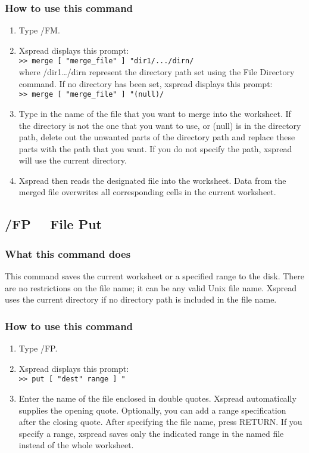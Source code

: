 \subsubsection*{How to use this command}
\begin{enumerate}
\item{Type /FM.}
\item{Xspread displays this prompt:\\
        \verb|>> merge [ "merge_file" ] "dir1/.../dirn/|\\
        where /dir1\ldots /dirn represent the directory path set using the
        File Directory command.  If no directory has been set, xspread
        displays this prompt:\\
        \verb|>> merge [ "merge_file" ] "(null)/| }
\item{Type in the name of the file that you want to merge into the
        worksheet.  If the directory is not the one that you want to use,
        or (null) is in the directory path, delete out the unwanted parts
        of the directory path and replace these parts with the path that
        you want.  If you do not specify the path, xspread will use the
        current directory. }
\item{Xspread then reads the designated file into the worksheet.  Data
        from the merged file overwrites all corresponding cells in the
        current worksheet.}
\end{enumerate}
        
\subsection*{/FP \ \     File Put}

\subsubsection*{What this command does}
This command saves the current worksheet or a specified range to the 
disk.  There are no restrictions on the file name; it can be any valid 
Unix file name.  Xspread uses the current directory if no directory 
path is included in the file name.

\subsubsection*{How to use this command}
\begin{enumerate}
\item{Type /FP.}
\item{Xspread displays this prompt:\\
        {\tt >> put [ "dest" range ] "} }
\item{Enter the name of the file enclosed in double quotes.  Xspread
        automatically supplies the opening quote.  Optionally, you can add
        a range specification after the closing quote.  After specifying
        the file name, press RETURN.  If you specify a range, xspread
        saves only the indicated range in the named file instead of the
        whole worksheet.}
\end{enumerate}
        
